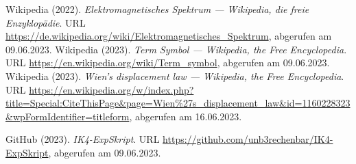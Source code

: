 \documentclass[../main.tex]{subfiles}
\begin{document}
\begin{thebibliography}{99}
		 Wikipedia (2022). \emph{Elektromagnetisches Spektrum --- Wikipedia{,} die freie Enzyklopädie}. URL \url{https://de.wikipedia.org/wiki/Elektromagnetisches_Spektrum}, abgerufen am 09.06.2023.
		 Wikipedia (2023). \emph{Term Symbol --- Wikipedia{,} the Free Encyclopedia}. URL \url{https://en.wikipedia.org/wiki/Term_symbol}, abgerufen am 09.06.2023.
		 Wikipedia (2023). \emph{Wien's displacement law --- Wikipedia{,} the Free Encyclopedia}. URL \url{https://en.wikipedia.org/w/index.php?title=Special:CiteThisPage&page=Wien%27s_displacement_law&id=1160228323&wpFormIdentifier=titleform}, abgerufen am 16.06.2023.

		 GitHub (2023). \emph{IK4-ExpSkript}. URL \url{https://github.com/unb3rechenbar/IK4-ExpSkript}, abgerufen am 09.06.2023.


	\end{thebibliography}
\end{document}
